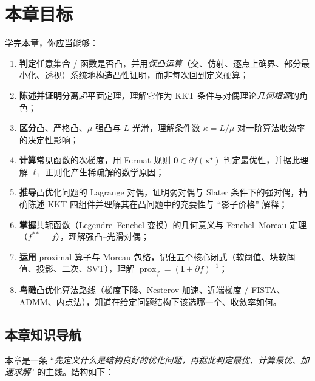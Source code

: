 \section*{本章目标}
学完本章，你应当能够：
\begin{enumerate}
  \item \textbf{判定}任意集合 / 函数是否凸，并用\emph{保凸运算}（交、仿射、逐点上确界、部分最小化、透视）系统地构造凸性证明，而非每次回到定义硬算；
  \item \textbf{陈述并证明}分离超平面定理，理解它作为 KKT 条件与对偶理论\emph{几何根源}的角色；
  \item \textbf{区分}凸、严格凸、$\mu$-强凸与 $L$-光滑，理解条件数 $\kappa=L/\mu$ 对一阶算法收敛率的决定性影响；
  \item \textbf{计算}常见函数的次梯度，用 Fermat 规则 $\mathbf 0\in\partial f(\mathbf x^\star)$ 判定最优性，并据此理解 $\ell_1$ 正则化产生稀疏解的数学原因；
  \item \textbf{推导}凸优化问题的 Lagrange 对偶，证明弱对偶与 Slater 条件下的强对偶，精确陈述 KKT 四组件并理解其在凸问题中的充要性与 “影子价格” 解释；
  \item \textbf{掌握}共轭函数（Legendre--Fenchel 变换）的几何意义与 Fenchel--Moreau 定理（$f^{\ast\ast}=f$），理解强凸--光滑对偶；
  \item \textbf{运用} proximal 算子与 Moreau 包络，记住五个核心闭式（软阈值、块软阈值、投影、二次、SVT），理解 $\operatorname{prox}_f=(\mathbf I+\partial f)^{-1}$；
  \item \textbf{鸟瞰}凸优化算法路线（梯度下降、Nesterov 加速、近端梯度 / FISTA、ADMM、内点法），知道在给定问题结构下该选哪一个、收敛率如何。
\end{enumerate}

\subsection*{本章知识导航}
本章是一条 “\emph{先定义什么是结构良好的优化问题，再据此判定最优、计算最优、加速求解}” 的主线。结构如下：

